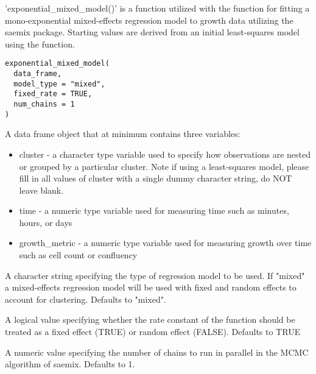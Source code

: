 \documentclass[a4paper]{book}
\begin{document}
%
\begin{Description}
'exponential\_mixed\_model()' is a function utilized with the
 function for fitting a mono-exponential
mixed-effects regression model to growth data utilizing the saemix package.
Starting values are derived from an initial least-squares model using
the  function.
\end{Description}
%
\begin{Usage}
\begin{verbatim}
exponential_mixed_model(
  data_frame,
  model_type = "mixed",
  fixed_rate = TRUE,
  num_chains = 1
)
\end{verbatim}
\end{Usage}
%
\begin{Arguments}
\begin{ldescription}
\item[\code{data\_frame}] A data frame object that at minimum contains three
variables:
\begin{itemize}

\item{} cluster - a character type variable used to specify how observations
are nested or grouped by a particular cluster. Note if using a
least-squares model, please fill in all values of cluster with a single
dummy character string, do NOT leave blank.
\item{} time - a numeric type variable used for measuring time such as
minutes, hours, or days
\item{} growth\_metric - a numeric type variable used for measuring growth
over time such as cell count or confluency

\end{itemize}


\item[\code{model\_type}] A character string specifying the type of regression
model to be used. If "mixed" a mixed-effects regression model will be used
with fixed and random effects to account for clustering. Defaults to "mixed".

\item[\code{fixed\_rate}] A logical value specifying whether the rate constant
of the function should be treated as a fixed effect (TRUE) or random
effect (FALSE). Defaults to TRUE

\item[\code{num\_chains}] A numeric value specifying the number of chains to run
in parallel in the MCMC algorithm of saemix. Defaults to 1.
\end{ldescription}
\end{Arguments}
\end{document}

